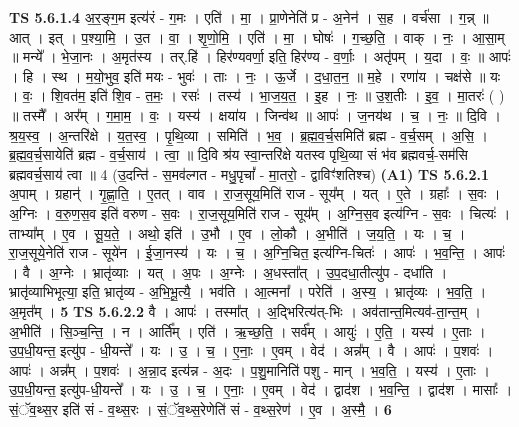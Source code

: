 \documentclass[17pt]{extarticle}
\begin{document}
                                \textbf{ TS 5.6.1.4} \newline
                  अ॒र॒ङ्ग॒म इत्य॑रं - ग॒मः । एति॑ । मा॒ । प्रा॒णेनेति॑ प्र - अ॒नेन॑ । स॒ह । वर्च॑सा । ग॒न्न् ॥ आत् । इत् । प॒श्या॒मि॒ । उ॒त । वा॒ । शृ॒णो॒मि॒ । एति॑ । मा॒ । घोषः॑ । ग॒च्छ॒ति॒ । वाक् । नः॒ । आ॒सा॒म् ॥ मन्ये᳚ । भे॒जा॒नः । अ॒मृत॑स्य । तर्.हि॑ । हिर॑ण्यवर्णा॒ इति॒ हिर॑ण्य - व॒र्णाः॒ । अतृ॑पम् । य॒दा । वः॒ ॥ आपः॑ । हि । स्थ । म॒यो॒भुव॒ इति॑ मयः - भुवः॑ । ताः । नः॒ । ऊ॒र्जे । द॒धा॒त॒न॒ ॥ म॒हे । रणा॑य । चक्ष॑से ॥ यः । वः॒ । शि॒वत॑म॒ इति॑ शि॒व - त॒मः॒ । रसः॑ । तस्य॑ । भा॒ज॒य॒त॒ । इ॒ह । नः॒ ॥ उ॒श॒तीः । इ॒व॒ । मा॒तरः॑ ( ) ॥ तस्मै᳚ । अर᳚म् । ग॒मा॒म॒ । वः॒ । यस्य॑ । क्षया॑य । जिन्व॑थ ॥ आपः॑ । ज॒नय॑थ । च॒ । नः॒ ॥ दि॒वि । श्र॒य॒स्व॒ । अ॒न्तरि॑क्षे । य॒त॒स्व॒ । पृ॒थि॒व्या । समिति॑ । भ॒व॒ । ब्र॒ह्म॒व॒र्च॒समिति॑ ब्रह्म - व॒र्च॒सम् । अ॒सि॒ । ब्र॒ह्म॒व॒र्च॒सायेति॑ ब्रह्म - व॒र्च॒साय॑ । त्वा॒ ॥ \textbf{ } \newline
                  \newline
                      दि॒वि श्र॑य स्वा॒न्तरि॑क्षे यतस्व पृथि॒व्या सं भ॑व ब्रह्मवर्च॒-सम॑सि ब्रह्मवर्च॒साय॑ त्वा ॥ 4 (उ॒दन्ति॑ - स॒मव॑ल्गत - मधु॒पृचां᳚ - मा॒तरो॒ - द्वाविꣳ॑शतिश्च)  \textbf{(A1)} \newline \newline
                                \textbf{ TS 5.6.2.1} \newline
                  अ॒पाम् । ग्रहान्॑ । गृ॒ह्णा॒ति॒ । ए॒तत् । वाव । रा॒ज॒सूय॒मिति॑ राज - सूय᳚म् । यत् । ए॒ते । ग्रहाः᳚ । स॒वः । अ॒ग्निः । व॒रु॒ण॒स॒व इति॑ वरुण - स॒वः । रा॒ज॒सूय॒मिति॑ राज - सूय᳚म् । अ॒ग्नि॒स॒व इत्य॑ग्नि - स॒वः । चित्यः॑ । ताभ्या᳚म् । ए॒व । सू॒य॒ते॒ । अथो॒ इति॑ । उ॒भौ । ए॒व । लो॒कौ । अ॒भीति॑ । ज॒य॒ति॒ । यः । च॒ । रा॒ज॒सूये॒नेति॑ राज - सूये॑न । ई॒जा॒नस्य॑ । यः । च॒ । अ॒ग्नि॒चित॒ इत्य॑ग्नि-चितः॑ । आपः॑ । भ॒व॒न्ति॒ । आपः॑ । वै । अ॒ग्नेः । भ्रातृ॑व्याः । यत् । अ॒पः । अ॒ग्नेः । अ॒धस्ता᳚त् । उ॒प॒दधा॒तीत्यु॑प - दधा॑ति । भ्रातृ॑व्याभिभूत्या॒ इति॒ भ्रातृ॑व्य - अ॒भि॒भू॒त्यै॒ । भव॑ति । आ॒त्मना᳚ । परेति॑ । अ॒स्य॒ । भ्रातृ॑व्यः । भ॒व॒ति॒ । अ॒मृत᳚म् । \textbf{  5} \newline
                  \newline
                                \textbf{ TS 5.6.2.2} \newline
                  वै । आपः॑ । तस्मा᳚त् । अ॒द्भिरित्य॑त्-भिः । अव॑तान्त॒मित्यव॑-ता॒न्त॒म् । अ॒भीति॑ । सि॒ञ्च॒न्ति॒ । न । आर्ति᳚म् । एति॑ । ऋ॒च्छ॒ति॒ । सर्व᳚म् । आयुः॑ । ए॒ति॒ । यस्य॑ । ए॒ताः । उ॒प॒धी॒यन्त॒ इत्यु॑प - धी॒यन्ते᳚ । यः । उ॒ । च॒ । ए॒नाः॒ । ए॒वम् । वेद॑ । अन्न᳚म् । वै । आपः॑ । प॒शवः॑ । आपः॑ । अन्न᳚म् । प॒शवः॑ । अ॒न्ना॒द इत्य॑न्न - अ॒दः । प॒शु॒मानिति॑ पशु - मान् । भ॒व॒ति॒ । यस्य॑ । ए॒ताः । उ॒प॒धी॒यन्त॒ इत्यु॑प-धी॒यन्ते᳚ । यः । उ॒ । च॒ । ए॒नाः॒ । ए॒वम् । वेद॑ । द्वाद॑श । भ॒व॒न्ति॒ । द्वाद॑श । मासाः᳚ । सं॒ॅव॒थ्स॒र इति॑ सं - व॒थ्स॒रः । सं॒ॅव॒थ्स॒रेणेति॑ सं - व॒थ्स॒रेण॑ । ए॒व । अ॒स्मै॒ । \textbf{  6} \newline
\end{document}

